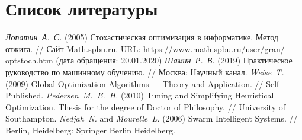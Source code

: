 \clearpage                                  %


\chapter{Список литературы}


\begin{thebibliography}{7}
	 \textit{Лопатин\ А.\ С.} (2005) Стохастическая оптимизация
в информатике. Метод отжига. // Сайт Math.spbu.ru. URL: https://www.math.spbu.ru/user/gran/\\optstoch.htm (дата обращения: 20.01.2020)
	 \textit{Шамин\ Р.\ В.} (2019) Практическое руководство по машинному обучению. // Москва: Научный канал.
	 \textit{Weise\ T.} (2009) Global Optimization Algorithms --- Theory and
Application. // Self-Published.
	 \textit{Pedersen\ M.\ E.\ H.} (2010) Tuning and Simplifying Heuristical Optimization. Thesis for the degree of Doctor of Philosophy. // University of Southampton.
	 \textit{Nedjah\ N.} and \textit{Mourelle\ L.} (2006) Swarm Intelligent Systems. // Berlin, Heidelberg: Springer Berlin Heidelberg.
\end{thebibliography}
